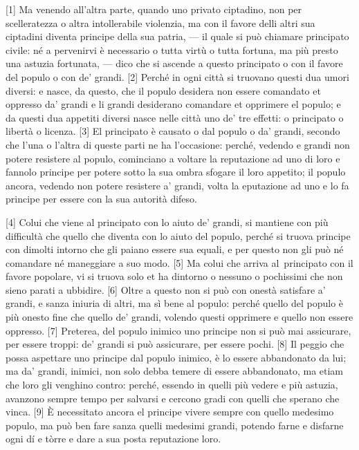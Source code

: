 {[}1{]} Ma venendo all'altra parte, quando uno privato ciptadino, non
per scelleratezza o altra intollerabile violenzia, ma con il favore
delli altri sua ciptadini diventa principe della sua patria, --- il quale
si può chiamare principato civile: né a pervenirvi è necessario o tutta
virtù o tutta fortuna, ma più presto una astuzia fortunata, --- dico che si ascende a questo principato o con il favore del populo o con de' grandi. {[}2{]} Perché in ogni città si truovano questi dua umori diversi: e nasce, da questo, che il populo desidera non essere comandato et oppresso da' grandi e li grandi desiderano comandare et opprimere el populo; e da questi dua appetiti diversi nasce nelle città uno de' tre effetti: o principato o libertà o licenza. {[}3{]} El principato è causato o dal populo o da' grandi, secondo che l'una o l'altra di queste parti ne ha l'occasione: perché, vedendo e grandi non potere resistere al populo, cominciano a voltare la reputazione ad uno di loro e fannolo principe per potere sotto la sua ombra sfogare il loro appetito; il populo ancora, vedendo non potere resistere a' grandi, volta la eputazione ad uno e lo fa principe per essere con la sua autorità difeso.

{[}4{]} Colui che viene al principato con lo aiuto de' grandi, si
mantiene con più difficultà che quello che diventa con lo aiuto del
populo, perché si truova principe con dimolti intorno che gli paiano
essere sua equali, e per questo non gli può né comandare né maneggiare a
suo modo. {[}5{]} Ma colui che arriva al\est\ principato con il favore
popolare, vi si truova solo et ha dintorno o nessuno o pochissimi che
non sieno parati a ubbidire.
{[}6{]} Oltre a questo non si può con onestà satisfare a' grandi, e
sanza iniuria di altri, ma sì bene al populo: perché quello del populo è
più onesto fine che quello de' grandi, volendo questi opprimere e quello
non essere oppresso. {[}7{]} Preterea, del populo inimico uno principe
non si può mai assicurare, per essere troppi: de' grandi si può
assicurare, per essere pochi. {[}8{]} Il peggio che possa aspettare uno
principe dal populo inimico, è lo essere abbandonato da lui; ma da'
grandi, inimici, non solo debba temere di essere abbandonato, ma etiam
che loro gli venghino contro: perché, essendo in quelli più vedere e più
astuzia, avanzono sempre tempo per salvarsi e cercono gradi con quelli
che sperano che vinca. {[}9{]} È necessitato ancora el principe vivere
sempre con quello medesimo populo, ma può ben fare sanza quelli medesimi
grandi, potendo farne e disfarne ogni dí e tòrre e dare a sua posta
reputazione loro.

